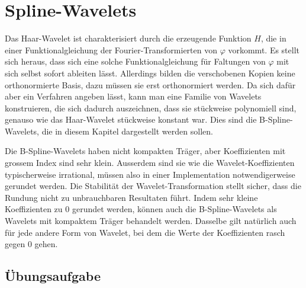 %
%
%
\chapter{Spline-Wavelets
\label{chapter:spline}}
\rhead{}
Das Haar-Wavelet ist charakterisiert durch die erzeugende Funktion $H$,
die in einer Funktionalgleichung der Fourier-Transformierten von $\varphi$
vorkommt.
Es stellt sich heraus, dass sich eine solche Funktionalgleichung für 
Faltungen von $\varphi$ mit sich selbst sofort ableiten lässt.
Allerdings bilden die verschobenen Kopien keine orthonormierte Basis,
dazu müssen sie erst orthonormiert werden.
Da sich dafür aber ein Verfahren angeben lässt, kann man eine Familie 
von Wavelets konstruieren, die sich dadurch auszeichnen, dass sie
stückweise polynomiell sind, genauso wie das Haar-Wavelet stückweise
konstant war.
Dies sind die B-Spline-Wavelets, die in diesem Kapitel dargestellt werden
sollen.

Die B-Spline-Wavelets haben nicht kompakten Träger, aber Koeffizienten
mit grossem Index sind sehr klein.
Ausserdem sind sie wie die Wavelet-Koeffizienten typischerweise irrational,
müssen also in einer Implementation notwendigerweise gerundet werden.
Die Stabilität der Wavelet-Transformation stellt sicher, dass die Rundung
nicht zu unbrauchbaren Resultaten führt.
Indem sehr kleine Koeffizienten zu $0$ gerundet werden, können auch die
B-Spline-Wavelets als Wavelets mit kompaktem Träger behandelt werden.
Dasselbe gilt natürlich auch für jede andere Form von Wavelet, bei dem
die Werte der Koeffizienten rasch gegen $0$ gehen.





\section*{Übungsaufgabe}


